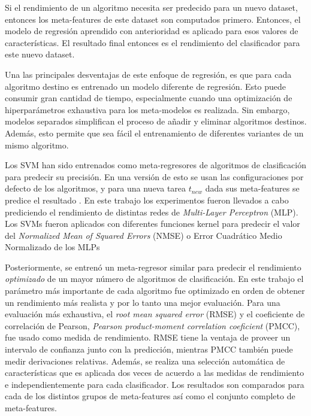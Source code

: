 Si el rendimiento de un algoritmo necesita ser predecido para un nuevo dataset, entonces los meta-features de este dataset son computados primero. Entonces, el modelo de regresión aprendido con anterioridad es aplicado para esos valores de características. El resultado final entonces es el rendimiento del clasificador para este nuevo dataset.

Una las principales desventajas de este enfoque de regresión, es que para cada algoritmo destino es entrenado un modelo diferente de regresión. Esto puede consumir gran cantidad de tiempo, especialmente cuando una optimización de hiperparámetros exhaustiva para los meta-modelos es realizada. Sin embargo, modelos separados simplifican el proceso de añadir y eliminar algoritmos destinos. Además, esto permite que sea fácil el entrenamiento de diferentes variantes de un mismo algoritmo.

Los SVM han sido entrenados como meta-regresores de algoritmos de clasificación para predecir su precisión. En una versión de esto se usan las configuraciones por defecto de los algoritmos, y para una nueva tarea $t_{new}$ dada sus meta-features se predice el resultado \cite{guerra2008predicting}. En este trabajo los experimentos fueron llevados a cabo prediciendo el rendimiento de distintas redes de \textit{Multi-Layer Perceptron} (MLP). Los SVMs fueron aplicados con diferentes funciones kernel para predecir el valor del \textit{Normalized Mean of Squared Errors} (NMSE) o Error Cuadrático Medio Normalizado de los MLPs

Posteriormente, se entrenó un meta-regresor similar \cite{reif2012automatic} para predecir el rendimiento \textit{optimizado} de un mayor número de algoritmos de clasificación. En este trabajo el parámetro más importante de cada algoritmo fue optimizado en orden de obtener un rendimiento más realista y por lo tanto una mejor evaluación. Para una evaluación más exhaustiva, el \textit{root mean squared error} (RMSE) y el coeficiente de correlación de Pearson, \textit{Pearson product-moment correlation coeficient} (PMCC), fue usado como medida de rendimiento. RMSE tiene la ventaja de proveer un intervalo de confianza junto con la predicción, mientras PMCC también puede medir derivaciones relativas. Además, se realiza una selección automática de características que es aplicada dos veces de acuerdo a las medidas de rendimiento e independientemente para cada clasificador. Los resultados son comparados para cada de los distintos grupos de meta-features así como el conjunto completo de meta-features.

